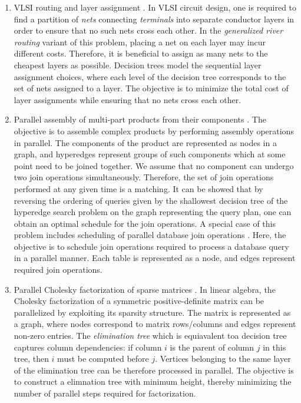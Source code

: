 \begin{enumerate}
        \item VLSI routing and layer assignment \cite{OnAGPartWAppVLSI}. In VLSI circuit design, one is required to find a partition of \textit{nets} connecting \textit{terminals} into separate conductor layers in order to ensure that no such nets cross each other. In the \textit{generalized river routing} variant of this problem, placing a net on each layer may incur different costs. Therefore, it is beneficial to assign as many nets to the cheapest layers as possible. Decision trees model the sequential layer assignment choices, where each level of the decision tree corresponds to the set of nets assigned to a layer. The objective is to minimize the total cost of layer assignments while ensuring that no nets cross each other.
        \item Parallel assembly of multi-part products from their components \cite{ParAofModPs,Dereniowski2009ERankOfWTs}. The objective is to assemble complex products by performing assembly operations in parallel. The components of the product are represented as nodes in a graph, and hyperedges represent groups of such components which at some point need to be joined together. We assume that no component can undergo two join operations simultaneously. Therefore, the set of join operations performed at any given time is a matching. It can be showed that by reversing the ordering of queries given by the shallowest decision tree of the hyperedge search problem on the graph representing the query plan, one can obtain an optimal schedule for the join operations. A special case of this problem includes scheduling of parallel database join operations \cite{DereniowskiEfPQProcByGRank,OnMinERSTs,MinERSTrofTGs}. Here, the objective is to schedule join operations required to process a database query in a parallel manner. Each table is represented as a node, and edges represent required join operations.
        \item Parallel Cholesky factorization of sparse matrices \cite{Dereniowski2003CholeskyFactofMx}. In linear algebra, the Cholesky factorization of a symmetric positive-definite matrix can be parallelized by exploiting its sparsity structure. The matrix is represented as a graph, where nodes correspond to matrix rows/columns and edges represent non-zero entries. The \textit{elimination tree} which is equiavalent toa  decision tree captures column dependencies: if column $i$ is the parent of column $j$ in this tree, then $i$ must be computed before $j$. Vertices belonging to the same layer of the elimination tree can be therefore processed in parallel. The objective is to construct a elimnation tree with minimum height, thereby minimizing the number of parallel steps required for factorization.

\end{enumerate}
